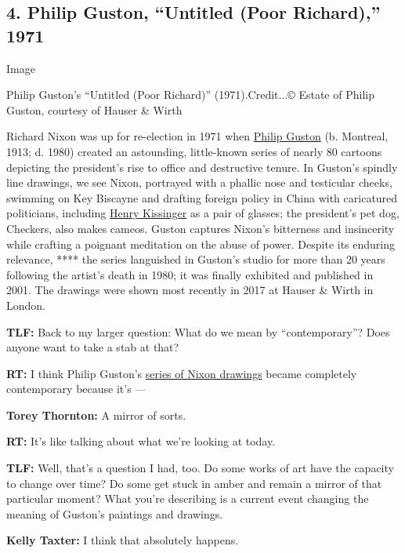 \hypertarget{4-philip-guston-untitled-poor-richard-1971}{%
\subsection{4. Philip Guston, ``Untitled (Poor Richard),''
1971}\label{4-philip-guston-untitled-poor-richard-1971}}

Image

Philip Guston's ``Untitled (Poor Richard)'' (1971).Credit...© Estate of
Philip Guston, courtesy of Hauser \& Wirth

Richard Nixon was up for re-election in 1971 when
\href{https://www.nytimes.com/2017/05/16/t-magazine/art/philip-guston-venice.html}{Philip
Guston} (b. Montreal, 1913; d. 1980) created an astounding, little-known
series of nearly 80 cartoons depicting the president's rise to office
and destructive tenure. In Guston's spindly line drawings, we see Nixon,
portrayed with a phallic nose and testicular cheeks, swimming on Key
Biscayne and drafting foreign policy in China with caricatured
politicians, including
\href{https://www.nytimes.com/topic/person/henry-a-kissinger}{Henry
Kissinger} as a pair of glasses; the president's pet dog, Checkers, also
makes cameos. Guston captures Nixon's bitterness and insincerity while
crafting a poignant meditation on the abuse of power. Despite its
enduring relevance, **** the series languished in Guston's studio for
more than 20 years following the artist's death in 1980; it was finally
exhibited and published in 2001. The drawings were shown most recently
in 2017 at Hauser \& Wirth in London.

\textbf{TLF:} Back to my larger question: What do we mean by
``contemporary''? Does anyone want to take a stab at that?

\textbf{RT:} I think Philip Guston's
\href{https://www.nytimes.com/2016/10/31/arts/design/philip-guston-and-his-barbed-pen-nixon-years.html}{series
of Nixon drawings} became completely contemporary because it's ---

\textbf{Torey Thornton:} A mirror of sorts.

\textbf{RT:} It's like talking about what we're looking at today.

\textbf{TLF:} Well, that's a question I had, too. Do some works of art
have the capacity to change over time? Do some get stuck in amber and
remain a mirror of that particular moment? What you're describing is a
current event changing the meaning of Guston's paintings and drawings.

\textbf{Kelly Taxter:} I think that absolutely happens.

